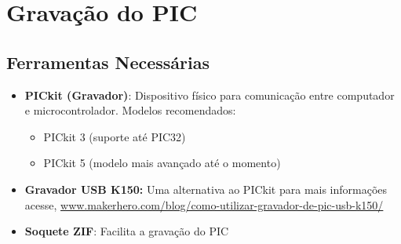 \documentclass[12pt,a4paper]{book}
\begin{document}
\section{Gravação do PIC}
\subsection{Ferramentas Necessárias}
\begin{itemize}
    \item \textbf{PICkit (Gravador)}: Dispositivo físico para comunicação entre computador e microcontrolador. Modelos recomendados:
    \begin{itemize}
        \item PICkit 3 (suporte até PIC32)
        \item PICkit 5 (modelo mais avançado até o momento)
    \end{itemize}
    \item \textbf{Gravador USB K150:} Uma alternativa ao PICkit para mais informações acesse, \url{www.makerhero.com/blog/como-utilizar-gravador-de-pic-usb-k150/}
    \item \textbf{Soquete ZIF}: Facilita a gravação do PIC
    
\end{itemize}
\end{document}
